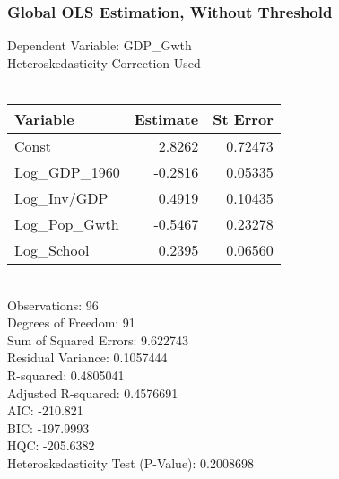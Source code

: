 \subsubsection{Global OLS Estimation, Without Threshold} 
Dependent Variable:      GDP\_Gwth \\
Heteroskedasticity Correction Used \\\\
\begin{tabular}{l*{2}{r}}
\toprule
Variable    &   Estimate     &   St Error \\
\midrule 
Const   &    2.8262   &   0.72473 \\
Log\_GDP\_1960   &   -0.2816   &   0.05335 \\
Log\_Inv/GDP   &    0.4919   &   0.10435 \\
Log\_Pop\_Gwth   &   -0.5467   &   0.23278 \\
Log\_School   &    0.2395   &   0.06560 \\
\bottomrule
\end{tabular}
\bigskip \\
Observations:                       96 \\
Degrees of Freedom:                 91 \\
Sum of Squared Errors:              9.622743 \\
Residual Variance:                  0.1057444 \\
R-squared:                          0.4805041 \\
Adjusted R-squared:                 0.4576691 \\
AIC:                                -210.821 \\
BIC:                                -197.9993 \\
HQC:                                -205.6382 \\
Heteroskedasticity Test (P-Value):  0.2008698 \\

